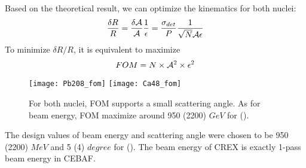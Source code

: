 Based on the theoretical result, we can optimize the kinematics for both nuclei:
\begin{equation}
    \frac{\delta R}{R} = \frac{\delta \mathcal{A}}{\mathcal{A}} \frac{1}{\epsilon} 
	= \frac{\sigma_{det}}{P} \frac{1}{\sqrt{N} \mathcal{A} \epsilon}
\end{equation}
To minimize $\delta R/R$, it is equivalent to maximize 
\begin{equation}
    FOM = N\times \mathcal{A}^2 \times \epsilon^2
\end{equation}
\begin{figure}
    \texttt{[image: Pb208\_fom]}
    \texttt{[image: Ca48\_fom]}
    \caption{For both nuclei, FOM supports a small scattering angle. As for beam energy,
    FOM maximize around 950 (2200) $GeV$ for \Pb (\Ca).}
\end{figure}

The design values of beam energy and scattering angle were chosen to be 950 (2200) $MeV$
and 5 (4) $degree$ for \Pb (\Ca). The beam energy of CREX is exactly 1-pass beam
energy in CEBAF.
\begin{comment}
    The measured asymmetry will be:
    \begin{equation*}
	\CA = \frac{2\pi}{R} \int \CA_0(\theta)R(\theta)d\theta
    \end{equation*}

    For PREX-II: average sensitivity reduced by 5\% due to ${}^{12}C$ contamination
    For CREX: average sensitivity reduced by 10\% due to ${}^{40}Ca$ contamination

    While a quartz Cerenkov detector is valued for radiation hardness and insensitivity to soft backgrounds, there is a particular challenge for few GeV electrons. In this energy range, shower fluctuations in a thick or radiated detector significantly degrade energy resolution, while photon statistics degrade the energy resolution for a thin detector. The energy resolution $\Delta E$ at nominal electron energy E increases the statistical error that one would have with infinite resolution $\sigma_0$ to obtain the total statistical error:
$$ \sigma = \sigma_0\sqrt{1+\left(\frac{\Delta E}{E}\right)^2}$$
    
Based on experience in the PREX experiment, we expect an reduction of statistical precision of a factor of 1.06 due to detector resolution.

\bigskip
Using HRS of Hall A, a \textbf{small} scattering angle maximizes the FOM. 
Given practical constraints on how low an angle ($4^\circ$) we can reach with 
septum magnets, the energy is fixed and turns out to be 2.2 GeV, which is a 
natural 1-pass beam energy for CEBAF operations in the 12 GeV era.
\end{comment}

